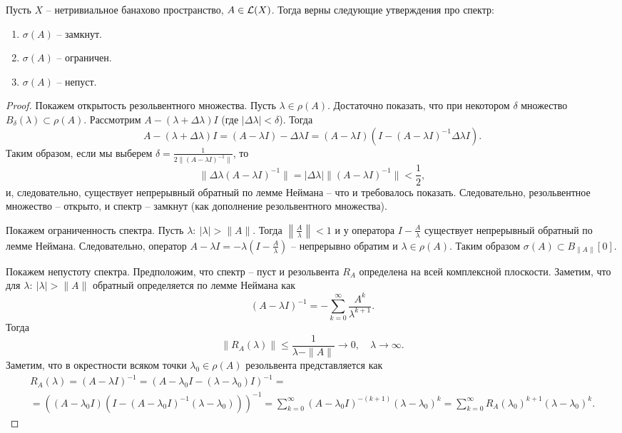 \begin{theorem}
    Пусть $X$ -- нетривиальное банахово пространство, $A \in \mathcal{L}(X)$.
    Тогда верны следующие утверждения про спектр:
    \begin{enumerate}
        \item $\sigma(A)$ -- замкнут.
        \item $\sigma(A)$ -- ограничен.
        \item $\sigma(A)$ -- непуст.
    \end{enumerate}
\end{theorem}
\begin{proof}
    Покажем открытость резольвентного множества.
    Пусть $\lambda \in \rho(A)$.
    Достаточно показать, что при некотором $\delta$ множество $B_\delta(\lambda) \subset \rho(A)$.
    Рассмотрим $A - (\lambda + \Delta \lambda)I$ (где $|\Delta \lambda| < \delta$).
    Тогда
    \[
        A - (\lambda + \Delta \lambda)I = (A - \lambda I) - \Delta \lambda I = (A - \lambda I)(I - (A - \lambda I)^{-1}\Delta \lambda I).
    \]
    Таким образом, если мы выберем $\delta = \frac{1}{2\|(A - \lambda I)^{-1}\|}$, то
    \[
        \|\Delta \lambda(A - \lambda I)^{-1}\| = |\Delta \lambda|\|(A - \lambda I)^{-1}\| < \frac{1}{2},
    \]
    и, следовательно, существует непрерывный обратный по лемме Неймана -- что и требовалось показать.
    Следовательно, резольвентное множество -- открыто, и спектр -- замкнут (как дополнение резольвентного множества).

    Покажем ограниченность спектра.
    Пусть $\lambda\colon \ |\lambda| > \|A\|$.
    Тогда $\left\|\frac{A}{\lambda}\right\| < 1$ и у оператора $I - \frac{A}{\lambda}$ существует непрерывный обратный по лемме Неймана. Следовательно, оператор $A - \lambda I = -\lambda\left(I - \frac{A}{\lambda}\right)$ -- непрерывно обратим и $\lambda \in \rho(A)$.
    Таким образом $\sigma(A) \subset B_{\|A\|}[0]$.

    Покажем непустоту спектра.
    Предположим, что спектр -- пуст и резольвента $R_A$ определена на всей комплексной плоскости.
    Заметим, что для $\lambda\colon \ |\lambda| > \|A\|$ обратный определяется по лемме Неймана как 
    \[
        (A - \lambda I)^{-1} = -\sum_{k = 0}^{\infty} \frac{A^k}{\lambda^{k + 1}}.
    \]
    Тогда
    \[
        \|R_{A}(\lambda)\| \leq \frac{1}{\lambda - \|A\|} \rightarrow 0, \quad \lambda \rightarrow \infty.
    \]
    Заметим, что в окрестности всяком точки $\lambda_0 \in \rho(A)$ резольвента представляется как 
    \begin{multline*}
        R_A(\lambda) = (A - \lambda I)^{-1} = \left(A - \lambda_0 I - (\lambda - \lambda_0)I\right)^{-1} = \\ = \left((A - \lambda_0 I)(I - (A - \lambda_0 I)^{-1}(\lambda - \lambda_0))\right)^{-1} = \sum_{k = 0}^{\infty} (A - \lambda_0 I)^{-(k + 1)}(\lambda - \lambda_0)^k = \sum_{k = 0}^{\infty} R_A(\lambda_0)^{k + 1}(\lambda - \lambda_0)^k.
    \end{multline*}


\end{proof}
